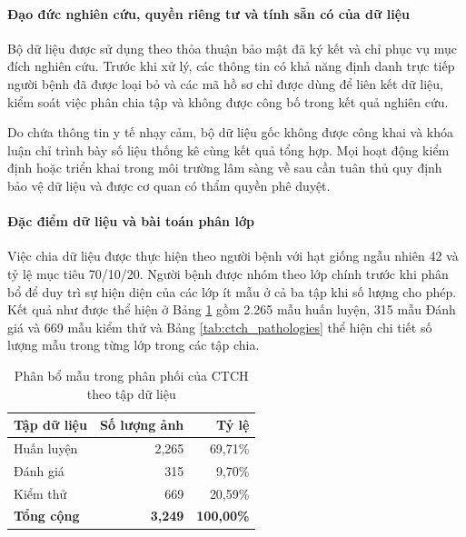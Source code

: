 \paragraph{Đạo đức nghiên cứu, quyền riêng tư và tính sẵn có của dữ liệu}

Bộ dữ liệu được sử dụng theo thỏa thuận bảo mật đã ký kết và chỉ phục vụ mục đích nghiên cứu. Trước khi xử lý, các thông tin có khả năng định danh trực tiếp người bệnh đã được loại bỏ và các mã hồ sơ chỉ được dùng để liên kết dữ liệu, kiểm soát việc phân chia tập và không được công bố trong kết quả nghiên cứu. 

Do chứa thông tin y tế nhạy cảm, bộ dữ liệu gốc không được công khai và khóa luận chỉ trình bày số liệu thống kê cùng kết quả tổng hợp. Mọi hoạt động kiểm định hoặc triển khai trong môi trường lâm sàng về sau cần tuân thủ quy định bảo vệ dữ liệu và được cơ quan có thẩm quyền phê duyệt.

\paragraph{Đặc điểm dữ liệu và bài toán phân lớp}

Việc chia dữ liệu được thực hiện theo người bệnh với hạt giống ngẫu nhiên 42 và tỷ lệ mục tiêu 70/10/20. Người bệnh được nhóm theo lớp chính trước khi phân bổ để duy trì sự hiện diện của các lớp ít mẫu ở cả ba tập khi số lượng cho phép. Kết quả như được thể hiện ở Bảng \ref{tab:ctch_splits} gồm 2.265 mẫu huấn luyện, 315 mẫu Đánh giá và 669 mẫu kiểm thử và Bảng \ref{tab:ctch_pathologies} thể hiện chi tiết số lượng mẫu trong từng lớp trong các tập chia.

\clearpage

\begin{table}[htbp]
\centering
\small
\begin{tabular}{|l|r|r|}
\hline
\textbf{Tập dữ liệu} & \textbf{Số lượng ảnh} & \textbf{Tỷ lệ} \\ \hline
Huấn luyện & 2,265 & 69,71\% \\ \hline
Đánh giá & 315 & 9,70\% \\ \hline
Kiểm thử & 669 & 20,59\% \\ \hline
\textbf{Tổng cộng} & \textbf{3,249} & \textbf{100,00\%} \\ \hline
\end{tabular}
\caption{Phân bổ mẫu trong phân phối của CTCH theo tập dữ liệu}
\label{tab:ctch_splits}
\end{table}

